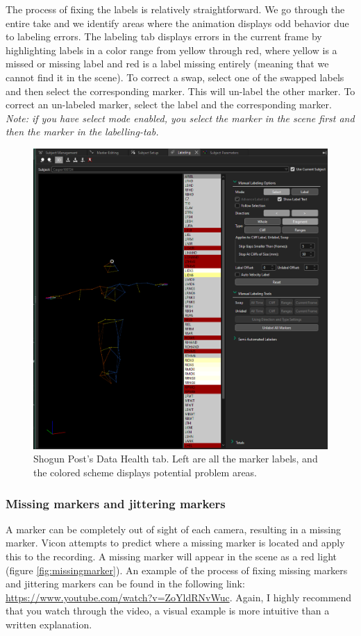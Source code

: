 \documentclass{uva-inf-article}
\begin{document}
The process of fixing the labels is relatively straightforward. We go through the entire take and we identify areas where the animation displays odd behavior due to labeling errors. The labeling tab displays errors in the current frame by highlighting labels in a color range from yellow through red, where yellow is a missed or missing label and red is a label missing entirely (meaning that we cannot find it in the scene). To correct a swap, select one of the swapped labels and then select the corresponding marker. This will un-label the other marker. To correct an un-labeled marker, select the label and the corresponding marker. \textit{Note: if you have select mode enabled, you select the marker in the scene first and then the marker in the labelling-tab.}

\begin{figure}[hbt!]
    \centering
    \includegraphics[width=.8\textwidth]{imgs/labeling.png}
    \caption{Shogun Post's Data Health tab. Left are all the marker labels, and the colored scheme displays potential problem areas.}
    \label{fig:labeling}
\end{figure}

\subsubsection{Missing markers and jittering markers}
A marker can be completely out of sight of each camera, resulting in a missing marker. Vicon attempts to predict where a missing marker is located and apply this to the recording. A missing marker will appear in the scene as a red light (figure \ref{fig:missingmarker}). An example of the process of fixing missing markers and jittering markers can be found in the following link: \url{https://www.youtube.com/watch?v=ZoYldRNvWuc}. Again, I highly recommend that you watch through the video, a visual example is more intuitive than a written explanation.
\end{document}
